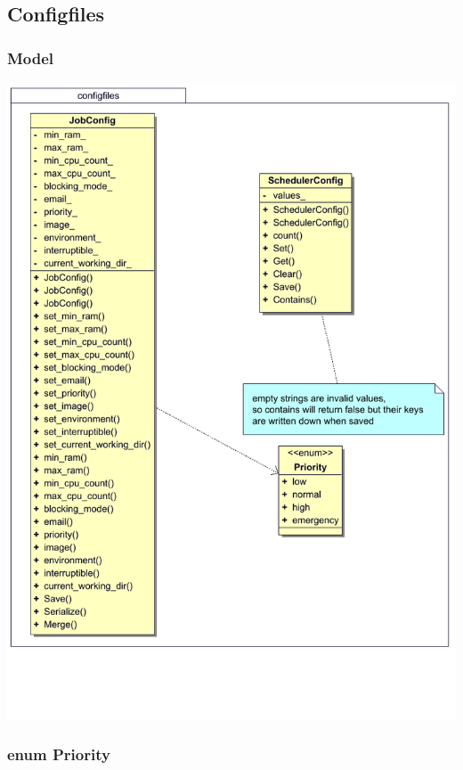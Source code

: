 \documentclass[a4paper,12pt]{article}
\begin{document}
\subsection{Configfiles}

\subsubsection{Model}

\includegraphics[width=\textwidth]{configfiles}

\subsubsection{enum Priority}
\end{document}
